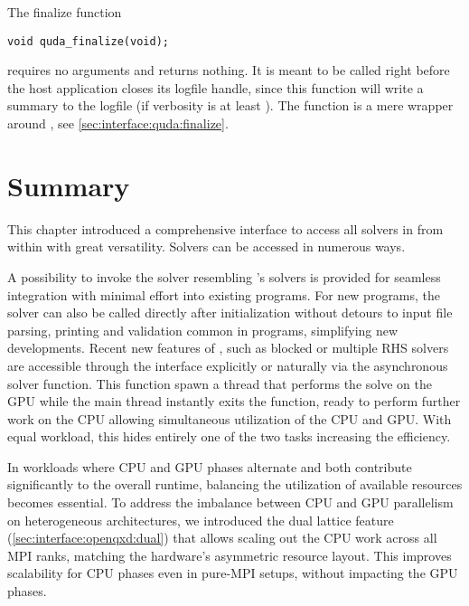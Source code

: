 
The finalize function
\begin{verbatim}
void quda_finalize(void);
\end{verbatim}
requires no arguments and returns nothing.
It is meant to be called right before the host application closes its logfile handle, since this function will write a summary to the logfile (if verbosity is at least ).
The function is a mere wrapper around , see \cref{sec:interface:quda:finalize}.

\section{Summary}
\label{sec:interface:summary}


This chapter introduced a comprehensive interface to access all solvers in \quda from within \openqxd with great versatility.
Solvers can be accessed in numerous ways.%

A possibility to invoke the solver resembling \openqxd's solvers is provided for seamless integration with minimal effort into existing programs.
For new programs, the solver can also be called directly after initialization without detours to input file parsing, printing and validation common in \openqxd programs, simplifying new developments.
Recent new features of \quda, such as blocked or multiple RHS solvers are accessible through the interface explicitly or naturally via the asynchronous solver function.
This function spawn a thread that performs the solve on the GPU while the main thread instantly exits the function, ready to perform further work on the CPU allowing simultaneous utilization of the CPU and GPU.
With equal workload, this hides entirely one of the two tasks increasing the efficiency.

In workloads where CPU and GPU phases alternate and both contribute significantly to the overall runtime, balancing the utilization of available resources becomes essential.
To address the imbalance between CPU and GPU parallelism on heterogeneous architectures, we introduced the dual lattice feature (\cref{sec:interface:openqxd:dual}) that allows scaling out the CPU work across all MPI ranks, matching the hardware's asymmetric resource layout.
This improves scalability for CPU phases even in pure-MPI setups, without impacting the GPU phases.

